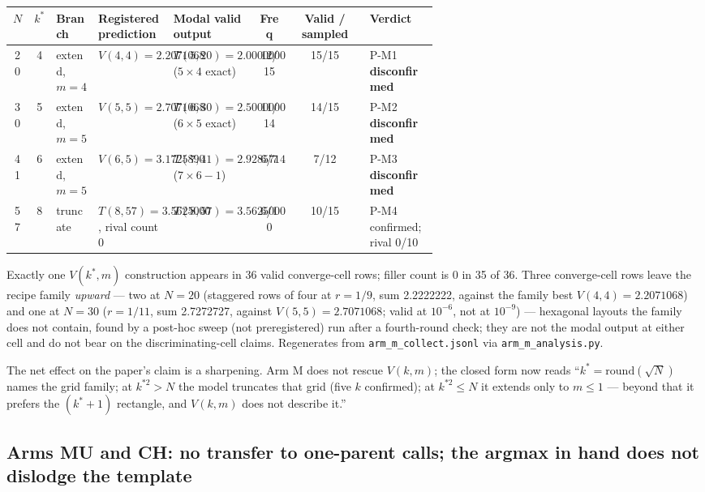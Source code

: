 \begin{center}
\begin{small}
\setlength{\tabcolsep}{3.5pt}
\begin{tabular}{@{}ccp{0.09\linewidth}p{0.16\linewidth}p{0.20\linewidth}ccp{0.16\linewidth}@{}}
\toprule
$N$ & $k^*$ & Branch & Registered prediction & Modal valid output & Freq & Valid / sampled & Verdict \\
\midrule
20 & 4 & extend, $m = 4$ & $V(4,4) = 2.2071068$ & $T(5,20) = 2.0000000$ ($5 \times 4$ exact) & 12/15 & 15/15 & P-M1 \textbf{disconfirmed} \\
30 & 5 & extend, $m = 5$ & $V(5,5) = 2.7071068$ & $T(6,30) = 2.5000000$ ($6 \times 5$ exact) & 11/14 & 14/15 & P-M2 \textbf{disconfirmed} \\
41 & 6 & extend, $m = 5$ & $V(6,5) = 3.1725890$ & $T(7,41) = 2.9285714$ ($7 \times 6 - 1$) & 6/7 & 7/12 & P-M3 \textbf{disconfirmed} \\
57 & 8 & truncate & $T(8,57) = 3.5625000$, rival count 0 & $T(8,57) = 3.5625000$ & 6/10 & 10/15 & P-M4 confirmed; rival 0/10 \\
\bottomrule
\end{tabular}
\end{small}
\end{center}

Exactly one $V(k^*, m)$ construction appears in 36 valid converge-cell rows; filler count is 0
in 35 of 36. Three converge-cell rows leave the recipe family \emph{upward} --- two at $N = 20$ (staggered rows of four at $r = 1/9$, sum 2.2222222, against the family best $V(4,4) = 2.2071068$) and one at $N = 30$ ($r = 1/11$, sum 2.7272727, against $V(5,5) = 2.7071068$; valid at $10^{-6}$, not at $10^{-9}$) --- hexagonal layouts the family does not contain, found by a post-hoc sweep (not preregistered) run after a fourth-round check; they are not the modal output at either cell and do not bear on the discriminating-cell claims. Regenerates from \texttt{arm\_m\_collect.jsonl} via \texttt{arm\_m\_analysis.py}.

The net effect on the paper's claim is a sharpening. Arm M does not rescue $V(k, m)$; the closed form now reads
``$k^* = \mathrm{round}(\sqrt{N})$ names the grid family; at $k^{*2} > N$ the model truncates that grid (five $k$
confirmed); at $k^{*2} \le N$ it extends only to $m \le 1$ --- beyond that it prefers the $(k^*{+}1)$
rectangle, and $V(k, m)$ does not describe it.''

\subsection{Arms MU and CH: no transfer to one-parent calls; the argmax in hand does not dislodge the template}

